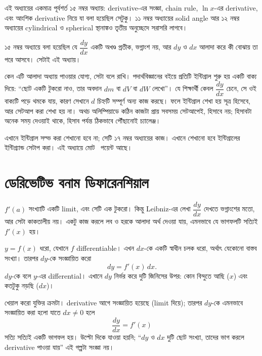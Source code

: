\documentclass[11pt]{article}
\begin{document}

\noindent
এই অধ্যায়ের একমাত্র পূর্বশর্ত ১৫ নম্বর অধ্যায়: derivative-এর সংজ্ঞা,
chain rule, $\ln x$-এর derivative, এবং আংশিক derivative নিয়ে যা বলা হয়েছিল
সেটুকু। ১১ নম্বর অধ্যায়ের solid angle আর ১২ নম্বর অধ্যায়ের
cylindrical ও spherical স্থানাঙ্কও তৃতীয় অনুচ্ছেদে সরাসরি লাগবে।

১৫ নম্বর অধ্যায়ে বলা হয়েছিল যে $\dfrac{dy}{dx}$ একটি অখণ্ড প্রতীক,
ভগ্নাংশ নয়, আর $dy$ ও $dx$ আলাদা করে কী বোঝায় তা পরে আসবে। সেটাই এই
অধ্যায়।

কেন এটি আলাদা অধ্যায় পাওয়ার যোগ্য, সেটা বলে রাখি। পদার্থবিজ্ঞানের বইয়ে
প্রতিটি ইন্টিগ্রাল শুরু হয় একটি বাক্য দিয়ে: ``ছোট একটি টুকরো নাও, তার অবদান
$dm$ বা $dV$ বা $dW$ লেখো''। যে শিক্ষার্থী কেবল $\dfrac{dy}{dx}$ চেনে, সে ওই
বাক্যটি পড়ে থমকে যায়, কারণ সেখানে $d$ চিহ্নটি সম্পূর্ণ অন্য কাজ করছে। ফলে
ইন্টিগ্রাল শেখা হয় সূত্র হিসেবে, আর সেটআপ করা শেখা হয় না। অথচ অলিম্পিয়াডে
কঠিন কাজটা প্রায় সবসময় সেটআপেই, হিসাবে নয়; হিসাবটা অনেক সময় দেওয়াই থাকে, হিসাব পর্যন্ত ঠিকভাবে পৌঁছানোই চ্যালেঞ্জ।

এখানে ইন্টিগ্রাল সল্ভ করা শেখানো হবে না; সেটি ১৭ নম্বর অধ্যায়ের কাজ। এখানে শেখানো হবে ইন্টিগ্রালের ইন্টিগ্র্যান্ড সেটাপ করা। এই অধ্যায়ে মোট
\totalpoints\ পয়েন্ট আছে।  

\section{ডেরিভেটিভ বনাম ডিফারেনশিয়াল}

$f'(a)$ সংখ্যাটি একটি limit, এবং সেটি এক টুকরো। কিন্তু Leibniz-এর লেখা
$\dfrac{dy}{dx}$ দেখতে ভগ্নাংশের মতো, আর সেটা কাকতালীয় নয়। একটু কাজ করলে
লব ও হরকে আলাদা অর্থ দেওয়া যায়, এমনভাবে যে ভাগফলটি সত্যিই $f'(x)$ হয়।

\begin{idea}[Differential]
$y = f(x)$ ধরো, যেখানে $f$ differentiable। এখন $dx$-কে একটি স্বাধীন চলক ধরো,
অর্থাৎ যেকোনো বাস্তব সংখ্যা। তারপর $dy$-কে সংজ্ঞায়িত করো
\[
  dy = f'(x)\,dx .
\]
$dy$-কে বলে $y$-এর differential। এখানে $dy$ নির্ভর করে দুটি জিনিসের উপর:
কোন বিন্দুতে আছি ($x$) এবং কতটুকু নড়ছি ($dx$)।
\end{idea}

খেয়াল করো যুক্তির ক্রমটা। derivative আগে সংজ্ঞায়িত হয়েছে (limit দিয়ে);
তারপর $dy$-কে এমনভাবে সংজ্ঞায়িত করা হলো যাতে $dx \neq 0$ হলে
\[
  \frac{dy}{dx} = f'(x)
\]
সত্যি সত্যিই একটি ভাগফল হয়। উল্টো দিকে যাওয়া হয়নি; ``$dy$ ও $dx$ দুটি ছোট
সংখ্যা, তাদের ভাগ করলে derivative পাওয়া যায়'' এই গল্পটা সংজ্ঞা নয়।
\end{document}

